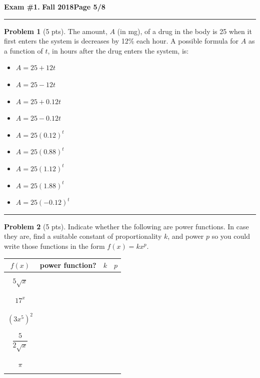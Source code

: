 \documentclass[12pt]{article}
\makeatletter
\theoremstyle{definition}
\newtheorem{problem}{Problem}
\newcommand*{\radiobutton}{%
  \@ifstar{\@radiobutton0}{\@radiobutton1}%
}
\newcommand*{\@radiobutton}[1]{%
  \begin{tikzpicture}
    \pgfmathsetlengthmacro\radius{height("X")/2}
    \draw[radius=\radius] circle;
    \ifcase#1 \fill[radius=.6*\radius] circle;\fi
  \end{tikzpicture}%
}
\makeatother
\begin{document}
\newpage

\hfill{\large\bf Exam \#1.}\hfill{\large\bf
  Fall 2018}\hfill{\large\bf Page 5/8}\hrule

\bigskip

\begin{problem}[5 pts]
The amount, $A$ (in mg), of a drug in the body is 25 when it first enters the system is decreases by 12\% each hour. A possible formula for $A$ as a function of $t$, in hours after the drug enters the system, is:
\begin{itemize}
\item[\radiobutton] $A= 25+12t$
\item[\radiobutton] $A=25-12t$
\item[\radiobutton] $A=25+0.12t$
\item[\radiobutton] $A=25-0.12t$
\item[\radiobutton] $A=25(0.12)^t$
\item[\radiobutton] $A=25(0.88)^t$
\item[\radiobutton] $A=25(1.12)^t$
\item[\radiobutton] $A=25(1.88)^t$
\item[\radiobutton] $A=25(-0.12)^t$
\end{itemize}
\end{problem}

\vspace{1cm}
\hrule

\begin{problem}[5 pts]
Indicate whether the following are power functions. In case they are, find a suitable constant of proportionality $k$, and power $p$ so you could write those functions in the form $f(x) = kx^p$.
\begin{center}
\begin{tabular}{|c|c|c|c|}
\hline
$f(x)$ & power function? & $k$ & $p$ \\
\hline
\hline
&&& \\
$5\sqrt{x}$ &&\hspace{1cm} & \hspace{1cm} \\
&&& \\
\hline
&&& \\
$17^x$ &&& \\
&&& \\
\hline
&&& \\
$(3x^5)^2$ &&& \\
&&& \\
\hline
&&& \\
$\dfrac{5}{2\sqrt{x}}$ &&& \\
&&& \\
\hline
&&& \\
$\pi$ &&& \\
&&& \\
\hline
\end{tabular}
\end{center}
\end{problem}
\newpage
\end{document}
